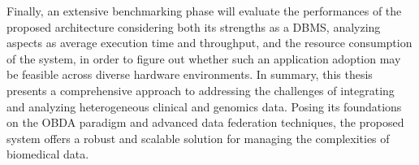 Finally, an extensive benchmarking phase will evaluate the performances of the proposed architecture considering both its strengths as a \ac{DBMS}, analyzing aspects as average execution time and throughput, and the resource consumption of the system, in order to figure out whether such an application adoption may be feasible across diverse hardware environments.
In summary, this thesis presents a comprehensive approach to addressing the challenges of integrating and analyzing heterogeneous clinical and genomics data. Posing its foundations on the OBDA paradigm and advanced data federation techniques, the proposed system offers a robust and scalable solution for managing the complexities of biomedical data.
